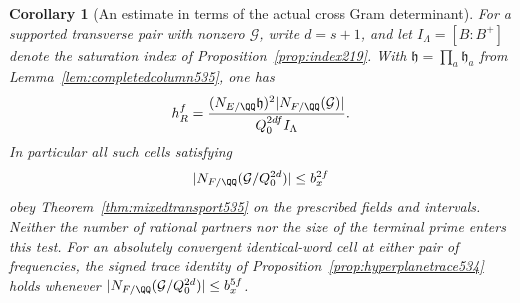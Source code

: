 \documentclass[a4paper,11pt]{article}
\newtheorem{corollary}[proposition]{Corollary}
\theoremstyle{definition}
\theoremstyle{remark}
\numberwithin{equation}{section}
\begin{document}
\begin{corollary}[An estimate in terms of the actual cross Gram determinant]
\leavevmode\label{cor:actualgram535}
For a supported transverse pair with nonzero \(\mathcal G\),
write \(d=s+1\), and let \(I_\Lambda=[B:B^+]\) denote the
saturation index of Proposition~\ref{prop:index219}. With
\(\mathfrak h=\prod_a\mathfrak h_a\) from
Lemma~\ref{lem:completedcolumn535}, one has
\[
     h_R^f=\frac{(N_{E/\QQ}\mathfrak h)^2
                    |N_{F/\QQ}(\mathcal G)|}{Q_0^{2df} I_\Lambda}.
\]
In particular all such cells satisfying
\[
              |N_{F/\QQ}(\mathcal G/Q_0^{2d})|\le b_x^{2f}
\]
obey Theorem~\ref{thm:mixedtransport535} on the prescribed
fields and intervals. Neither the number of rational partners
nor the size of the terminal prime enters this test.
For an absolutely convergent identical-word cell at either
pair of frequencies, the signed trace identity of
Proposition~\ref{prop:hyperplanetrace534} holds whenever
\(|N_{F/\QQ}(\mathcal G/Q_0^{2d})|\le b_x^{5f}\).
\end{corollary}
\end{document}
